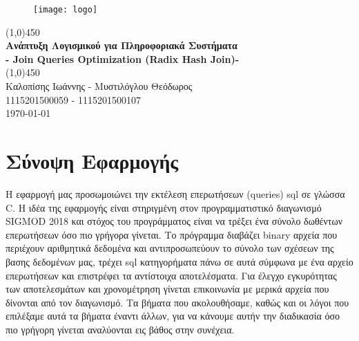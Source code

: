 \documentclass[12pt, a4paper]{article}
\begin{document}
\begin{titlepage}
\begin{center}
\vspace*{1cm}
\begin{figure}
\centering
\texttt{[image: logo]}\\
\end{figure}
\vfill
\line(1,0){450}\\[1mm]
\huge{\textbf{Ανάπτυξη Λογισμικού για Πληροφοριακά Συστήματα}}\\[3mm]
\Large{\textbf{- Join Queries Optimization (Radix Hash Join)-}}\\[1mm]
\line(1,0){450}\\
\vfill
Καλοπίσης Ιωάννης - Μυστιλόγλου Θεόδωρος\\
1115201500059 - 1115201500107\\
\today\\

\end{center}
\end{titlepage}

\tableofcontents
\clearpage

\setcounter{page}{1}

\section{Σύνοψη Εφαρμογής}

Η εφαρμογή μας προσωμοιώνει την εκτέλεση επερωτήσεων (queries) sql σε γλώσσα C. Η ιδέα της εφαρμογής είναι στηριγμένη στον προγραμματιστικό διαγωνισμό SIGMOD 2018 και στόχος του προγράμματος είναι να τρέξει ένα σύνολο δωθέντων επερωτήσεων όσο πιο γρήγορα γίνεται. Το πρόγραμμα διαβάζει binary αρχεία που περιέχουν αριθμητικά δεδομένα και αντιπροσωπεύουν το σύνολο των σχέσεων της βασης δεδομένων μας, τρέχει sql κατηγορήματα πάνω σε αυτά σύμφωνα με ένα αρχείο επερωτήσεων και επιστρέφει τα αντίστοιχα αποτελέσματα. Για έλεγχο εγκυρότητας των αποτελεσμάτων και χρονομέτρηση γίνεται επικοινωνία με μερικά αρχεία που δίνονται από τον διαγωνισμό. Τα βήματα που ακολουθήσαμε, καθώς και οι λόγοι που επιλέξαμε αυτά τα βήματα έναντι άλλων, για να κάνουμε αυτήν την διαδικασία όσο πιο γρήγορη γίνεται αναλύονται εις βάθος στην συνέχεια.\\
\end{document}
